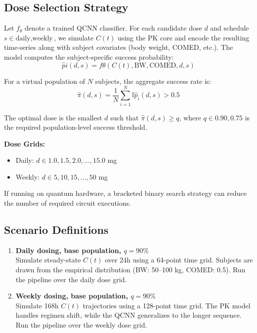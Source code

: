\documentclass[11pt]{article}
\begin{document}
\begin{itemize}
\subsection{Dose Selection Strategy}

Let $f_\theta$ denote a trained QCNN classifier. For each candidate dose $d$ and schedule $s \in {\text{daily}, \text{weekly}}$, we simulate $C(t)$ using the PK core and encode the resulting time-series along with subject covariates (body weight, COMED, etc.). The model computes the subject-specific success probability: \begin{equation} \hat{p}i(d, s) = f\theta(C(t), \text{BW}, \text{COMED}, d, s) \end{equation}

For a virtual population of $N$ subjects, the aggregate success rate is: \begin{equation} \hat{\pi}(d, s) = \frac{1}{N} \sum_{i=1}^{N} \mathbb{I}{ \hat{p}_i(d, s) > 0.5 } \end{equation}

The optimal dose is the smallest $d$ such that $\hat{\pi}(d, s) \geq q$, where $q \in {0.90, 0.75}$ is the required population-level success threshold.

\textbf{Dose Grids:} \begin{itemize} \item Daily: $d \in {1.0, 1.5, 2.0, \dots, 15.0}$ mg \item Weekly: $d \in {5, 10, 15, \dots, 50}$ mg \end{itemize}

If running on quantum hardware, a bracketed binary search strategy can reduce the number of required circuit executions.

\subsection{Scenario Definitions}

\begin{enumerate}[label=\textbf{\arabic*.}]
  \item \textbf{Daily dosing, base population, $q = 90\%$} \\
  Simulate steady-state $C(t)$ over 24h using a 64-point time grid. Subjects are drawn from the empirical distribution (BW: 50--100 kg, COMED: 0.5). Run the pipeline over the daily dose grid.

  \item \textbf{Weekly dosing, base population, $q = 90\%$} \\
  Simulate 168h $C(t)$ trajectories using a 128-point time grid. The PK model handles regimen shift, while the QCNN generalizes to the longer sequence. Run the pipeline over the weekly dose grid.


\end{enumerate}
\end{itemize}
\end{document}
